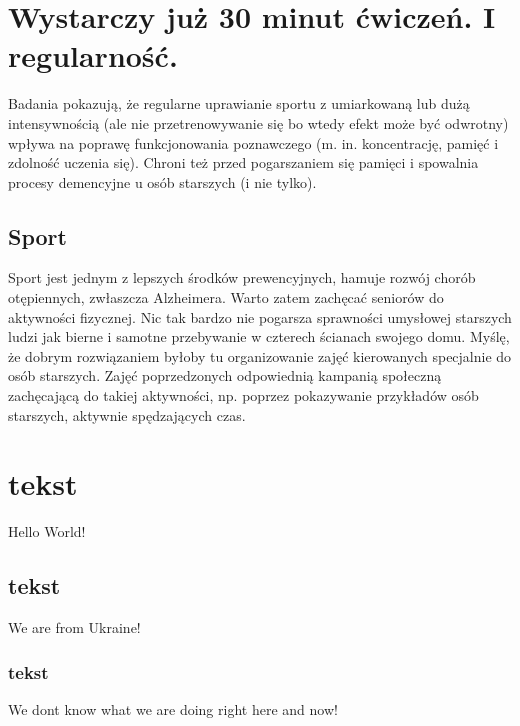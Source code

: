 \documentclass[12pt, letterpaper, titlepage]{article}
\begin{document}
\section{Wystarczy już 30 minut ćwiczeń. I regularność.}
Badania pokazują, że regularne uprawianie sportu z umiarkowaną lub dużą intensywnością (ale nie przetrenowywanie się bo wtedy efekt może być odwrotny) wpływa na poprawę funkcjonowania poznawczego (m. in. koncentrację, pamięć i zdolność uczenia się). Chroni też przed pogarszaniem się pamięci i spowalnia procesy demencyjne u osób starszych (i nie tylko).
\subsection{Sport}
Sport jest jednym z lepszych środków prewencyjnych, hamuje rozwój chorób otępiennych, zwłaszcza Alzheimera. Warto zatem zachęcać seniorów do aktywności fizycznej. Nic tak bardzo nie pogarsza sprawności umysłowej starszych ludzi jak bierne i samotne przebywanie w czterech ścianach swojego domu. Myślę, że dobrym rozwiązaniem byłoby tu organizowanie zajęć kierowanych specjalnie do osób starszych. Zajęć poprzedzonych odpowiednią kampanią społeczną zachęcającą do takiej aktywności, np. poprzez pokazywanie przykładów osób starszych, aktywnie spędzających czas.
\newpage
\section{tekst}
Hello World!
\subsection{tekst}
We are from Ukraine!
\subsubsection{tekst}
We dont know what we are doing right here and now!
\end{document}
